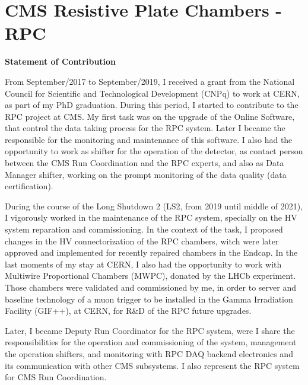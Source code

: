 \chapter{CMS Resistive Plate Chambers - RPC}
\label{chapter_rpc}

\begin{tcolorbox}
    {\footnotesize 
    \textbf{Statement of Contribution}

    \vspace{1em}
    From September/2017 to September/2019, I received a grant from the National Council for Scientific and Technological Development (CNPq) to work at CERN, as part of my PhD graduation. During this period, I started to contribute to the RPC project at CMS. My first task was on the upgrade of the Online Software, that control the data taking process for the RPC system. Later I became the responsible for the monitoring and maintenance of this software. I also had the opportunity to work as shifter for the operation of the detector, as contact person between the CMS Run Coordination and the RPC experts, and also as Data Manager shifter, working on the prompt monitoring of the data quality (data certification). 
    
    \vspace{1em}
    During the course of the Long Shutdown 2 (LS2, from 2019 until middle of 2021), I vigorously worked in the maintenance of the RPC system, specially on the HV system reparation and commissioning. In the context of the task, I proposed changes in the HV connectorization of the RPC chambers, witch were later approved and implemented for recently repaired chambers in the Endcap. In the last moments of my stay at CERN, I also had the opportunity to work with Multiwire Proportional Chambers (MWPC), donated by the LHCb experiment. Those chambers were validated and commissioned by me, in order to server and baseline technology of a muon trigger to be installed in the Gamma Irradiation Facility (GIF++), at CERN, for R\&D of the RPC future upgrades.

    \vspace{1em}
    Later, I became Deputy Run Coordinator for the RPC system, were I share the responsibilities for the operation and commissioning of the system, management the operation shifters, and monitoring with RPC DAQ backend electronics and its communication with other CMS subsystems. I also represent the RPC system for CMS Run Coordination. 

    \vspace{1em}
    }
\end{tcolorbox}

